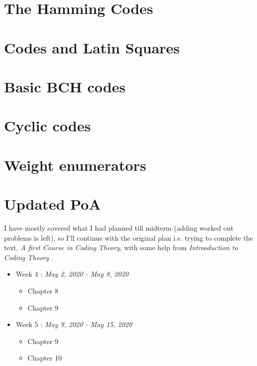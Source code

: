 \documentclass[11pt]{article}
\theoremstyle{definition}
\theoremstyle{remark}
\begin{document}
\section{The Hamming Codes}

\newpage
\section{Codes and Latin Squares}

\newpage
\section{Basic BCH codes}

\newpage
\section{Cyclic codes}

\newpage
\section{Weight enumerators}

\newpage

\iffalse
{}
\section*{Updated PoA}
I have mostly covered what I had planned till midterm (adding worked out problems is left), so I'll continue with the original plan i.e. trying to complete the text, \emph{A first Course in Coding Theory}\cite{mostly}, with some help from \emph{Introoduction to Coding Theory	}\cite{rarely}.

\begin{itemize}
	\item Week 4 : \textit{May 2, 2020 - May 8, 2020}
	\begin{itemize}
		\itemsep-1mm
		\item Chapter 8
		\item Chapter 9
	\end{itemize}
\end{itemize}

\begin{itemize}
	\item Week 5 : \textit{May 9, 2020 - May 15, 2020}
	\begin{itemize}
		\itemsep-1mm
		\item Chapter 9
		\item Chapter 10
	\end{itemize}
\end{itemize}
\end{document}

